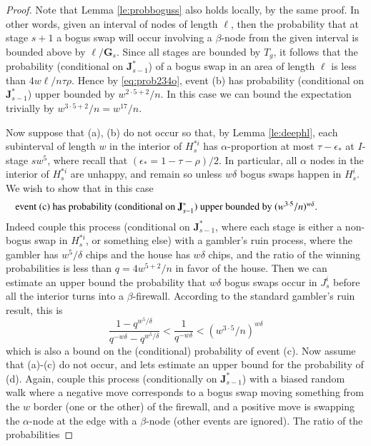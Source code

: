 \documentclass[11pt]{article}
\theoremstyle{plain}
\numberwithin{equation}{subsection}
\newcommand{\GG}{\mathbf{G}}
\newcommand{\JJ}{\mathbf{J}}
\begin{document}
\begin{proof}
Note that Lemma \ref{le:probboguss} also holds locally, by the same proof.
In other words, given an interval of nodes of length $\ell$, 
then the probability that at stage $s+1$ a bogus swap will occur involving a
$\beta$-node from the given interval is bounded above by $\ell/\GG_s$.
Since all stages are bounded by $T_g$, it follows that the probability (conditional on $\JJ^{\ast}_{s-1}$) 
of a bogus swap in an area of length $\ell$ is less than $4w\ell/n\tau\rho$.
Hence by \eqref{eq:prob234o}, event (b)  has probability 
(conditional on $\JJ^{\ast}_{s-1}$) upper bounded by $w^{2\cdot 5+2}/n$.
In this case we can bound the expectation trivially by $w^{3\cdot 5+2}/n=w^{17}/n$.

Now suppose that (a), (b) do not occur so that, by Lemma  \ref{le:deephl},
each subinterval of length $w$ in the interior of $H^{\ast i}_{s}$
has $\alpha$-proportion at most $\tau-\epsilon_{\ast}$ at $I$-stage $sw^5$, where 
recall that $(\epsilon_{\ast}=1-\tau-\rho)/2$.
In particular, all $\alpha$ nodes in 
the interior of
$H^{\ast i}_{s}$ are unhappy, 
and remain so unless $w\delta$ bogus swaps happen in $H^{i}_{s}$.
We wish to show that in this case
\begin{equation*}\parbox{12cm}{event (c)  has probability  (conditional on $\JJ^{\ast}_{s-1}$) 
upper bounded by $(w^{3\cdot 5}/n)^{w\delta}$.} 
\end{equation*}
Indeed couple this process (conditional on $\JJ^{\ast}_{s-1}$, 
 where each stage is either a non-bogus swap in $H^{\ast i}_{s}$, or something else) 
 with a gambler's ruin process, where the gambler has $w^5/\delta$ chips and the house has $w\delta$ chips,
 and the ratio of the winning probabilities is less than $q=4w^{5+2}/n$ in favor of the house. Then we can estimate an upper
 bound the probability
 that $w\delta$ bogus swaps occur in $J^{i}_{s}$ before all the interior turns into a $\beta$-firewall.
According to the standard gambler's ruin result, this is
 \[
 \frac{1-q^{w^5/\delta}}{q^{-w\delta}-q^{w^5/\delta}}<
 \frac{1}{q^{-w\delta}}<(w^{3\cdot 5}/n)^{w\delta}
 \]
which is also a bound on the (conditional) probability of event (c). 
Now assume that (a)-(c) do not occur, and lets estimate an upper bound for the probability of (d).
Again, couple this process (conditionally on $\JJ^{\ast}_{s-1}$) 
with a biased random walk where a negative move corresponds to a bogus swap moving
something from the $w$ border (one or the other) of the firewall, and a positive move is swapping the 
$\alpha$-node at the edge with a $\beta$-node (other events are ignored). The ratio of the probabilities

\end{proof}
\end{document}
